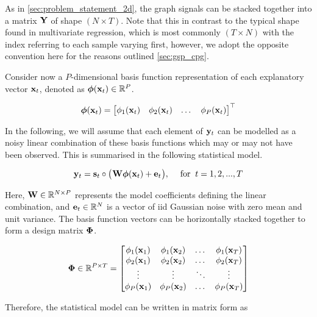 As in \cref{sec:problem_statement_2d}, the graph signals can be stacked together into a matrix $\mathbf{Y}$ of shape $(N \times T)$. Note that this in contrast to the typical shape found in multivariate regression, which is most commonly $(T \times N)$ with the index referring to each sample varying first, however, we adopt the opposite convention here for the reasons outlined \cref{sec:gsp_cpg}. 

Consider now a $P$-dimensional basis function representation of each explanatory vector $\mathbf{x}_t$, denoted as $\boldsymbol{\phi}(\mathbf{x}_t) \in \mathbb{R}^{P}$. 

\begin{equation}
    \boldsymbol{\phi}(\mathbf{x}_t) = 
    \begin{bmatrix}
        \phi_1(\mathbf{x}_t) & \phi_2(\mathbf{x}_t) & \dots & \phi_P(\mathbf{x}_t)
    \end{bmatrix}^\top
\end{equation}

In the following, we will assume that each element of $\mathbf{y}_t$ can be modelled as a noisy linear combination of these basis functions which may or may not have been observed. This is summarised in the following statistical model. 

\begin{equation}
    \mathbf{y}_t = \mathbf{s}_t \circ \big( \mspace{1mu} \mathbf{W} \boldsymbol{\phi}(\mathbf{x}_t) + \mathbf{e}_t \mspace{1mu} \big), \quad \; \text{for} \; \; t = 1, 2, ..., T
\end{equation}

Here, $\mathbf{W} \in \mathbb{R}^{N \times P}$ represents the model coefficients defining the linear combination, and $\mathbf{e}_t \in \mathbb{R}^{N}$ is a vector of iid Gaussian noise with zero mean and unit variance. The basis function vectors can be horizontally stacked together to form a design matrix $\mathbf{\Phi}$. 

\begin{equation}
    \mathbf{\Phi} \in \mathbb{R}^{P \times T} = \begin{bmatrix} 
        \phi_1(\mathbf{x}_1) & \phi_1(\mathbf{x}_2) & \dots & \phi_1(\mathbf{x}_T) \\
        \phi_2(\mathbf{x}_1) & \phi_2(\mathbf{x}_2) & \dots & \phi_2(\mathbf{x}_T) \\
        \vdots & \vdots & \ddots & \vdots  \\
        \phi_P(\mathbf{x}_1) & \phi_P(\mathbf{x}_2) & \dots & \phi_P(\mathbf{x}_T) \\
    \end{bmatrix}
\end{equation}

Therefore, the statistical model can be written in matrix form as 


